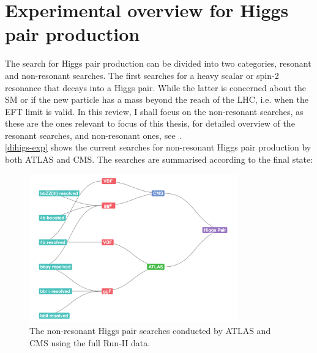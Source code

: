 \section{Experimental overview for Higgs pair production \label{exphh}  }
The search for Higgs pair production can be divided into two categories, resonant and non-resonant searches. The first searches for a heavy scalar or spin-2 resonance that decays into a Higgs pair. While the latter is concerned about the SM or if the new particle has a mass beyond the reach of the LHC, i.e. when the EFT limit is valid. In this review, I shall focus on the non-resonant searches, as these are the ones relevant to focus of this thesis, for detailed overview of the resonant searches, and non-resonant ones, see~\cite{DiMicco:2019ngk}.\\
%
\autoref{dihigs-exp} shows the current searches for non-resonant Higgs pair production by both ATLAS and CMS. The searches are summarised according to the final state:
\begin{figure}[!htpb]
	\centering
	\includegraphics[width = 0.8\textwidth]{./figures/HH-exp-network}
	\caption{The non-resonant Higgs pair searches conducted by ATLAS and CMS using the full Run-II data.} 
	\label{dihigs-exp}
\end{figure}
